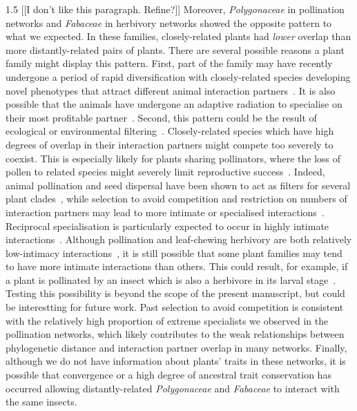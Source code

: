 \documentclass[12pt]{article}
\begin{document}
\begin{spacing}{1.5}
  [[I don't like this paragraph. Refine?]]
  Moreover, \emph{Polygonaceae} in pollination networks and 
  \emph{Fabaceae} in herbivory networks showed the opposite 
  pattern to what we expected. In these families, closely-related plants had 
  \emph{lower} overlap than more distantly-related pairs of plants. 
  There are several possible reasons a plant family might
  display this pattern. First, part of the family may have recently 
  undergone a period of rapid diversification with closely-related species 
  developing novel phenotypes that attract different animal 
  interaction partners~\citep{Linder2008,Breitkopf2015}. It is also possible that the
  animals have undergone an adaptive radiation to 
  specialise on their most profitable partner~\citep{Janz2006}. Second, this pattern 
  could be the result of ecological or environmental 
  filtering~\citep{Ackerly2003,Mayfield2009}. 
  Closely-related species which have high degrees of overlap in their interaction 
  partners might compete too severely to coexist. This is especially likely
  for plants sharing pollinators, where the loss of pollen to related species 
  might severely limit reproductive success~\citep{Levin1970,Bell2005,Mitchell2009}.
  Indeed, animal pollination and seed dispersal have been shown to act
  as filters for several plant clades~\citep{Mayfield2009}, while selection to avoid 
  competition and restriction on numbers of interaction partners may lead to
  more intimate or specialised interactions~\citep{Ponisio2017}. 
  Reciprocal specialisation is particularly expected to occur in highly intimate interactions~\citep{Hembry2018}. Although pollination and leaf-chewing herbivory are both relatively low-intimacy interactions~\citep{Astegiano2017}, it is still possible that some plant families may tend to have more intimate interactions than others. This could result, for example, if a plant is pollinated by an insect which is also a herbivore in its larval stage~\citep{Hembry2018}. Testing this possibility is beyond the scope of the present manuscript, but could be interestting for future work. 
  Past selection to avoid competition is 
  consistent with the relatively high proportion of extreme specialists we
  observed in the pollination networks, which likely contributes to the weak
  relationships between phylogenetic distance and interaction partner overlap
  in many networks. Finally, although we do not have information about plants'
  traits in these networks, it is possible that convergence or a high degree of
  ancestral trait conservation has occurred
  allowing distantly-related \emph{Polygonaceae} and \emph{Fabaceae} to
  interact with the same insects. 



\end{spacing}
\end{document}
